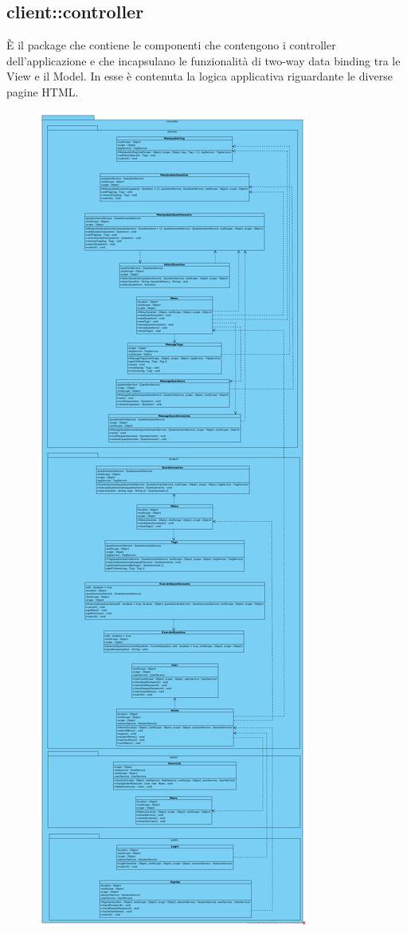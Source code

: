\subsection{client::controller}
È il package che contiene le componenti che contengono i
controller dell’applicazione e che incapsulano le funzionalità di two-way data binding tra le View e il Model. In esse è contenuta la logica applicativa riguardante le diverse pagine HTML.\begin{center}
		\begin{figure}[H]
			\centering \includegraphics[scale=4, max width=\textwidth, max height=\myheight]{../img/diagrammiClassi/client/controller.png}

\end{figure}
\end{center}
